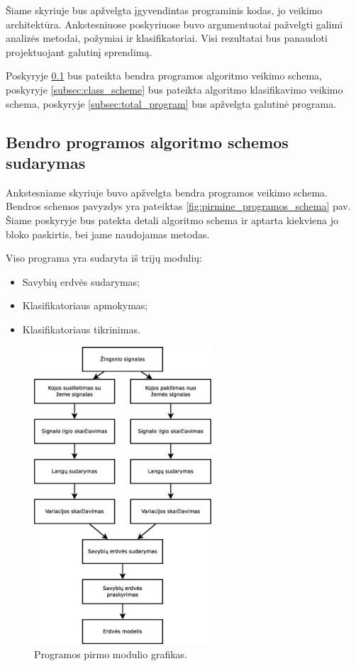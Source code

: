 \documentclass[]{vgtuef}
\begin{document}
Šiame skyriuje bus apžvelgta įgyvendintas programinis kodas, jo veikimo architektūra. Ankstesniuose poskyriuose buvo argumentuotai pažvelgti galimi analizės metodai, požymiai ir klasifikatoriai. Visi rezultatai bus panaudoti projektuojant galutinį sprendimą.

Poskyryje \ref{subsec:total_scheme} bus pateikta bendra programos algoritmo veikimo schema, poskyryje \ref{subsec:class_scheme} bus pateikta algoritmo klasifikavimo veikimo schema, poskyryje \ref{subsec:total_program} bus apžvelgta galutinė programa.

\subsection{Bendro programos algoritmo schemos sudarymas}
\label{subsec:total_scheme}

Ankstesniame skyriuje buvo apžvelgta bendra programos veikimo schema. Bendros schemos pavyzdys yra pateiktas \ref{fig:pirmine_programos_schema} pav. Šiame  poskyryje bus patekta detali algoritmo schema ir aptarta kiekviena jo bloko paskirtis, bei jame naudojamas metodas.

Viso programa yra sudaryta iš trijų modulių:

\begin{itemize}
\item Savybių erdvės sudarymas;
\item Klasifikatoriaus apmokymas;
\item Klasifikatoriaus tikrinimas.
\end{itemize}

\begin{figure}[!t]
  \centering
  \includegraphics[width=250px]{figures/pirma_faze.eps}
  \caption{Programos pirmo modulio grafikas.}
  \label{fig:pirma_faze}
\end{figure}
\end{document}
